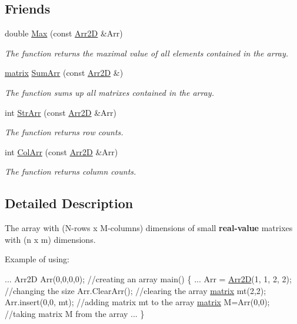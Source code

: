 \subsection*{Friends}
\begin{DoxyCompactItemize}
\item 
double \mbox{\hyperlink{class_arr2_d_a4a5ec0331f3df137656a3a959b40112b}{Max}} (const \mbox{\hyperlink{class_arr2_d}{Arr2D}} \&Arr)
\begin{DoxyCompactList}\small\item\em The function returns the maximal value of all elements contained in the array. \end{DoxyCompactList}\item 
\mbox{\hyperlink{classmatrix}{matrix}} \mbox{\hyperlink{class_arr2_d_a51c6d259f0af23458e423bf168730528}{Sum\+Arr}} (const \mbox{\hyperlink{class_arr2_d}{Arr2D}} \&)
\begin{DoxyCompactList}\small\item\em The function sums up all matrixes contained in the array. \end{DoxyCompactList}\item 
int \mbox{\hyperlink{class_arr2_d_a2bb49591960104f03344c72f4cf50d66}{Str\+Arr}} (const \mbox{\hyperlink{class_arr2_d}{Arr2D}} \&Arr)
\begin{DoxyCompactList}\small\item\em The function returns row counts. \end{DoxyCompactList}\item 
int \mbox{\hyperlink{class_arr2_d_a26461596a4c6662d3c715f23ea8ba89b}{Col\+Arr}} (const \mbox{\hyperlink{class_arr2_d}{Arr2D}} \&Arr)
\begin{DoxyCompactList}\small\item\em The function returns column counts. \end{DoxyCompactList}\end{DoxyCompactItemize}


\subsection{Detailed Description}
The array with (N-\/rows x M-\/columns) dimensions of small {\bfseries real-\/value} matrixes with (n x m) dimensions. 

Example of using\+: 
\begin{DoxyCode}
...
Arr2D Arr(0,0,0,0); \textcolor{comment}{//creating an array}
main() 
\{
  ...
  Arr = \mbox{\hyperlink{class_arr2_d}{Arr2D}}(1, 1, 2, 2); \textcolor{comment}{//changing the size}
  Arr.ClearArr();   \textcolor{comment}{//clearing the array}
  \mbox{\hyperlink{classmatrix}{matrix}} mt(2,2);  
  Arr.insert(0,0, mt); \textcolor{comment}{//adding matrix mt to the array}
  \mbox{\hyperlink{classmatrix}{matrix}} M=Arr(0,0); \textcolor{comment}{//taking matrix M from the array}
  ... 
\}
\end{DoxyCode}
 

